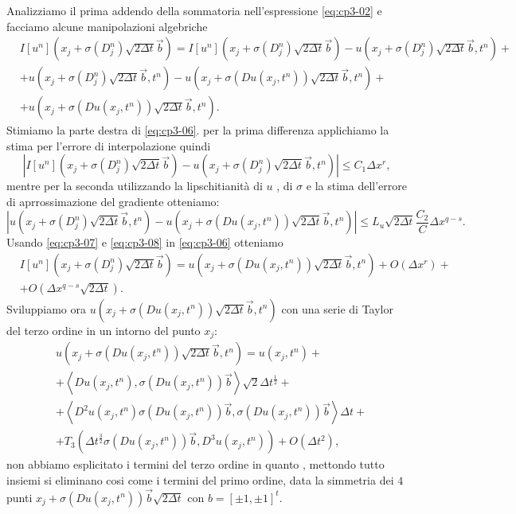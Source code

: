  Analizziamo il prima addendo della sommatoria nell'espressione \eqref{eq:cp3-02} e facciamo alcune manipolazioni algebriche
\begin{equation}
\label{eq:cp3-06}
\begin{split}
& I[u^n](x_j+\sigma(D_j^n)\sqrt{2\Delta t}\vec{b}) = I[u^n](x_j+\sigma(D_j^n)\sqrt{2\Delta t}\vec{b}) - u(x_j+\sigma(D_j^n)\sqrt{2\Delta t}\vec{b},t^n) + \\
& + u(x_j+\sigma(D_j^n)\sqrt{2\Delta t}\vec{b},t^n) - u(x_j+\sigma(Du(x_j,t^n))\sqrt{2\Delta t}\vec{b},t^n)+ \\
& + u(x_j+\sigma(Du(x_j,t^n))\sqrt{2\Delta t}\vec{b},t^n).
\end{split}
\end{equation}
Stimiamo la parte destra di \eqref{eq:cp3-06}. per la prima differenza applichiamo la stima per l'errore di interpolazione quindi
\begin{equation}
\label{eq:cp3-07}
|I[u^n](x_j+\sigma(D_j^n)\sqrt{2\Delta t}\vec{b}) - u(x_j+\sigma(D_j^n)\sqrt{2\Delta t}\vec{b},t^n)|\le C_1\Delta x^r,
\end{equation}
mentre per la seconda utilizzando la lipschitianità di $u$ , di $\sigma$ e la stima dell'errore di aprrossimazione del gradiente otteniamo:
\begin{equation}
\label{eq:cp3-08}
|u(x_j+\sigma(D_j^n)\sqrt{2\Delta t}\vec{b},t^n) - u(x_j+\sigma(Du(x_j,t^n))\sqrt{2\Delta t}\vec{b},t^n)|\le L_u\sqrt{2\Delta t}\frac{C_2}{C}\Delta x^{q-s}.
\end{equation}
Usando \eqref{eq:cp3-07} e \eqref{eq:cp3-08} in \eqref{eq:cp3-06} otteniamo
\[
\begin{split}
&I[u^n](x_j+\sigma(D_j^n)\sqrt{2\Delta t}\vec{b})=u(x_j+\sigma(Du(x_j,t^n))\sqrt{2\Delta t}\vec{b},t^n)+O(\Delta x^r)+ \\
& +O(\Delta x^{q-s}\sqrt{2\Delta t}).
\end{split}
\]
Sviluppiamo ora $u(x_j+\sigma(Du(x_j,t^n))\sqrt{2\Delta t}\vec{b},t^n)$ con una serie di Taylor del terzo ordine in un intorno del punto $x_j$:
\begin{equation}
\label{eq:cp3-09}
\begin{split}
&u(x_j+\sigma(Du(x_j,t^n))\sqrt{2\Delta t}\vec{b},t^n) = u(x_j,t^n)+ \\
&+\left<Du(x_j,t^n),\sigma(Du(x_j,t^n))\vec{b}\right>\sqrt{2}\Delta t^{\frac{1}{2}} +\\
&+\left<D^2u(x_j,t^n)\sigma(Du(x_j,t^n))\vec{b},\sigma(Du(x_j,t^n))\vec{b}\right>\Delta t + \\
&+T_3(\Delta t^{\frac{3}{2}}\sigma(Du(x_j,t^n))\vec{b},D^3u(x_j,t^n))+O(\Delta t^2), 
\end{split}
\end{equation}
non abbiamo esplicitato i termini del terzo ordine in quanto , mettondo tutto insiemi si eliminano cosi come i termini del primo ordine, data la simmetria dei $4$ punti $x_j+\sigma(Du(x_j,t^n))\vec{b}\sqrt{2\Delta t}$ con $b=[\pm 1,\pm 1]^t$.
